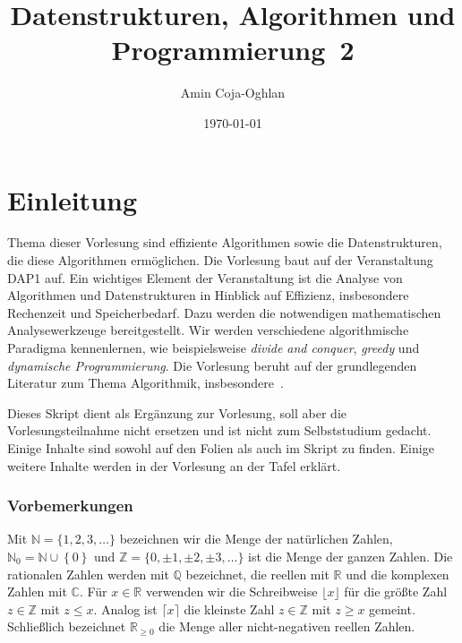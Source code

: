\documentclass[10pt,reqno]{amsart}
\numberwithin{equation}{section}
\newcommand\NN{\mathbb N}
\newcommand\ZZ{\mathbb Z}
\newcommand\QQ{\mathbb Q}
\newcommand\RR{\mathbb R}
\newcommand\RRpos{\mathbb R_{\geq0}}
\newcommand\CC{\mathbb C}
\newcommand\cbc[1]{\left\{{#1}\right\}}
\begin{document}
\title{Datenstrukturen, Algorithmen und Programmierung~2}

\author{Amin Coja-Oghlan}
\date{\today} 

\address{Amin Coja-Oghlan, {\tt  dap2.eac.fk04@tu-dortmund.de}, TU Dortmund, Fakult\"at~4, Lehrstuhl Informatik 2, Otto Hahn Str.~12, 44227 Dortmund}

\maketitle



\section{Einleitung}
Thema dieser Vorlesung sind effiziente Algorithmen sowie die Datenstrukturen, die diese Algorithmen erm\"oglichen.
Die Vorlesung baut auf der Veranstaltung DAP1 auf.
Ein wichtiges Element der Veranstaltung ist die Analyse von Algorithmen und Datenstrukturen in Hinblick auf Effizienz, insbesondere Rechenzeit und Speicherbedarf.
Dazu werden die notwendigen mathematischen Analysewerkzeuge bereitgestellt.
Wir werden verschiedene algorithmische Paradigma kennenlernen, wie beispielsweise {\em divide and conquer}, {\em greedy} und {\em dynamische Programmierung}.
Die Vorlesung beruht auf der grundlegenden Literatur zum Thema Algorithmik, insbesondere~\cite{Cormen}.

Dieses Skript dient als Erg\"anzung zur Vorlesung, soll aber die Vorlesungsteilnahme nicht ersetzen und ist nicht zum Selbststudium gedacht.
Einige Inhalte sind sowohl auf den Folien als auch im Skript zu finden.
Einige weitere Inhalte werden in der Vorlesung an der Tafel erkl\"art.

\subsubsection*{Vorbemerkungen}
Mit $\NN=\{1,2,3,\ldots\}$ bezeichnen wir die Menge der nat\"urlichen Zahlen, $\NN_0=\NN\cup\cbc0$ und $\ZZ=\{0,\pm1,\pm2,\pm3,\ldots\}$ ist die Menge der ganzen Zahlen. 
Die rationalen Zahlen werden mit $\QQ$ bezeichnet, die reellen mit $\RR$ und die komplexen Zahlen mit $\CC$.
F\"ur $x\in\RR$ verwenden wir die Schreibweise $\lfloor x\rfloor$ f\"ur die gr\"o\ss te Zahl $z\in\ZZ$ mit $z\leq x$.
Analog ist $\lceil x\rceil$ die kleinste Zahl $z\in\ZZ$ mit $z\geq x$ gemeint.
Schlie\ss lich bezeichnet $\RRpos$ die Menge aller nicht-negativen reellen Zahlen.
\end{document}
